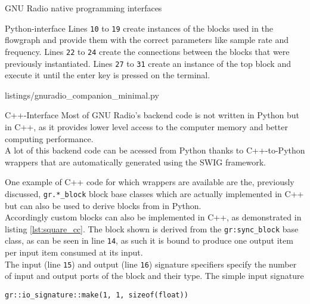 \begin{subchapter}{GNU Radio native programming interfaces}
\begin{subsubchapter}{Python-interface}
    Lines \texttt{10} to \texttt{19} create instances of the
    blocks used in the flowgraph and provide them with the
    correct parameters like sample rate and frequency.
    Lines \texttt{22} to \texttt{24} create the connections
    between the blocks that were previously instantiated.
    Lines \texttt{27} to \texttt{31} create an instance of the
    top block and execute it until the enter key is pressed
    on the terminal.

    
                    {listings/gnuradio_companion_minimal.py}

  \end{subsubchapter}

  \begin{subsubchapter}{C++-Interface}
    Most of GNU Radio's backend code is not written in Python
    but in C++, as it provides lower level access to the computer
    memory and better computing performance. \\

    A lot of this backend code can be acessed from Python
    thanks to C++-to-Python wrappers that are automatically
    generated using the SWIG \cite{swigweb} framework.

    One example of C++ code for which wrappers are available
    are the, previously discussed, \texttt{gr.*\_block} block
    base classes which are actually implemented in C++
    but can also be used to derive blocks from in Python. \\

    Accordingly custom blocks can also be implemented in
    C++, as demonstrated in listing \ref{lst:square_cc}.
    The block shown is derived from the \texttt{gr:sync\_block}
    base class, as can be seen in line \texttt{14}, as
    such it is bound to produce one output item
    per input item consumed at its input. \\

    The input (line \texttt{15}) and output (line \texttt{16})
    signature specifiers specify the number of input and output
    ports of the block and their type.
    The simple input signature

    \begin{center}
      \texttt{gr::io\_signature::make(1, 1, sizeof(float))}
    \end{center}


\end{subsubchapter}
\end{subchapter}
